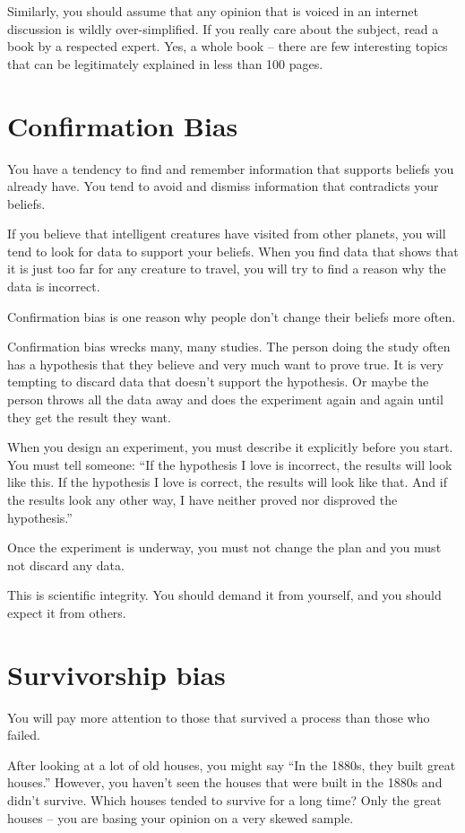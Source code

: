 Similarly, you should assume that any opinion that is voiced in an
internet discussion is wildly over-simplified.  If you really care
about the subject, read a book by a respected expert. Yes, a whole
book -- there are few interesting topics that can be legitimately
explained in less than 100 pages.

\section{Confirmation Bias}

You have a tendency to find and remember information that supports
beliefs you already have. You tend to avoid and dismiss information
that contradicts your beliefs.

If you believe that intelligent creatures have visited from other
planets, you will tend to look for data to support your beliefs. When
you find data that shows that it is just too far for any creature to
travel, you will try to find a reason why the data is incorrect.

Confirmation bias is one reason why people don't change their beliefs
more often.

Confirmation bias wrecks many, many studies. The person doing the
study often has a hypothesis that they believe and very much want to
prove true. It is very tempting to discard data that doesn't support
the hypothesis. Or maybe the person throws all the data away and does
the experiment again and again until they get the result they want.

When you design an experiment, you must describe it explicitly before
you start. You must tell someone: ``If the hypothesis I love is
incorrect, the results will look like this.  If the hypothesis I love
is correct, the results will look like that. And if the results look
any other way, I have neither proved nor disproved the hypothesis.''

Once the experiment is underway, you must not change the plan and you
must not discard any data.

This is scientific integrity. You should demand it from yourself, and
you should expect it from others.

\section{Survivorship bias}

You will pay more attention to those that survived a process than
those who failed.

After looking at a lot of old houses, you might say ``In the 1880s,
they built great houses.'' However, you haven't seen the houses that
were built in the 1880s and didn't survive.  Which houses tended to
survive for a long time? Only the great houses -- you are
basing your opinion on a very skewed sample.

